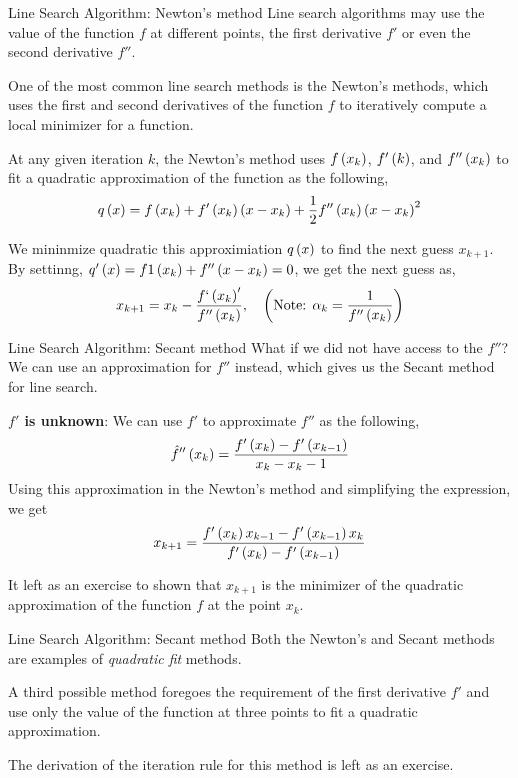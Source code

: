 \documentclass[aspectratio=169]{beamer}
\def\lp{\ensuremath\left(}
\def\rp{\ensuremath\right)}
\newcommand{\ct}[1]{\lp #1\rp}
\begin{document}
\begin{frame}{Line Search Algorithm: Newton's method}
  Line search algorithms may use the value of the function $f$ at different points, the first derivative $f'$ or even the second derivative $f''$.
  \vspace{0.25cm}

  One of the most common line search methods is the Newton's methods, which uses the first and second derivatives of the function $f$ to iteratively compute a local minimizer for a function.

  At any given iteration $k$, the Newton's method uses $f\ct{x_k}$, $f'\ct{k}$, and $f''\ct{x_k}$ to fit a quadratic approximation of the function as the following,
  \[ q\ct{x} = f\ct{x_k} + f'\ct{x_k}\ct{x - x_k} + \frac{1}{2}f''\ct{x_k}\ct{x - x_k}^2 \]

  We  mininmize quadratic this approximiation $q\ct{x}$ to find the next guess $x_{k+1}$. By settinng, $q'\ct{x} = f1\ct{x_k} + f''\ct{x - x_k} = 0$, we get the next guess as,
  \[ x_{k+1} = x_k - \frac{f`\ct{x_k}'}{f''\ct{x_k}}, \quad \ct{\text{Note: } \alpha_k = \frac{1}{f''\ct{x_k}}} \]
\end{frame}


\begin{frame}{Line Search Algorithm: Secant method}
  What if we did not have access to the $f''$? We can use an approximation for $f''$ instead, which gives us the Secant method for line search.
  \vspace{0.25cm}

  \textbf{$f'$ is unknown}: We can use $f'$ to approximate $f''$ as the following,
  \[ \hat{f}''\ct{x_k} = \frac{f'\ct{x_k} - f'\ct{x_{k-1}}}{x_k - x{_k-1}} \] 
  Using this approximation in the Newton's method and simplifying the expression, we get
  \[ x_{k+1} = \frac{f'\ct{x_k}x_{k-1} - f'\ct{x_{k-1}}x_k}{f'\ct{x_k} - f'\ct{x_{k - 1}}} \]

  It left as an exercise to shown that $x_{k+1}$ is the minimizer of the quadratic approximation of the function $f$ at the point $x_k$.

\end{frame}


\begin{frame}{Line Search Algorithm: Secant method}
  Both the Newton's and Secant methods are examples of \textit{quadratic fit} methods. 
  \vspace{0.25cm}
  
  A third possible method foregoes the requirement of the first derivative $f'$ and use only the value of the function at three points to fit a quadratic approximation. 
  \vspace{0.25cm}

  The derivation of the iteration rule for this method is left as an exercise.
\end{frame}
\end{document}
